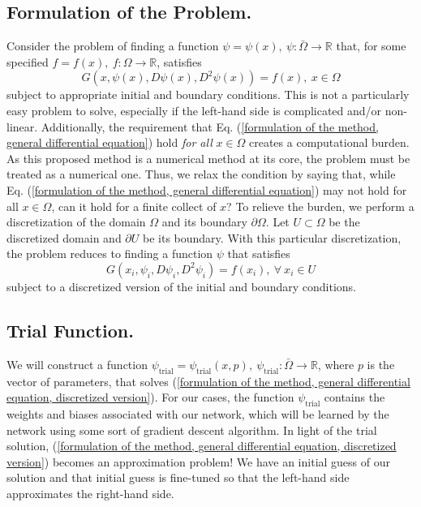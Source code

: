 \documentclass[10pt]{article}
\theoremstyle{plain}
\theoremstyle{definition}
\theoremstyle{remark}
\numberwithin{theorem}{section}
\numberwithin{proposition}{section}
\numberwithin{remark}{section}
\numberwithin{corollary}{section}
\numberwithin{definition}{section}
\numberwithin{lemma}{section}
\numberwithin{equation}{section}
\DeclareMathOperator{\T}{trial}
\begin{document}
\subsection{Formulation of the Problem.}
Consider the problem of finding a function $\psi = \psi(x), \: \psi: \bar{\Omega} \to \mathbb{R}$ that, for some specified $f = f(x), \: f: \Omega \to \mathbb{R}$, satisfies
\begin{equation}
	\label{formulation of the method, general differential equation}
	\displaystyle G(x,\psi(x),D\psi(x), D^2\psi(x)) = f(x), \: x \in \Omega 
\end{equation}
subject to appropriate initial and boundary conditions. This is not a particularly easy problem to solve, especially if the left-hand side is complicated and/or non-linear. Additionally, the requirement that Eq. (\ref{formulation of the method, general differential equation}) hold \textit{for all} $x \in \Omega$ creates a computational burden. As this proposed method is a numerical method at its core, the problem must be treated as a numerical one. Thus, we relax the condition by saying that, while Eq. (\ref{formulation of the method, general differential equation}) may not hold for all $x \in \Omega$, can it hold for a finite collect of $x$? To relieve the burden, we perform a discretization of the domain $\Omega$ and its boundary $\partial \Omega$. Let $U \subset \Omega$ be the discretized domain and $\partial U$ be its boundary. With this particular discretization, the problem reduces to finding a function $\psi$ that satisfies 
\begin{equation}
	\label{formulation of the method, general differential equation, discretized version}
	\displaystyle G(x_i, \psi_i, D\psi_i, D^2\psi_i) = f(x_i), \: \forall \: x_i \in U
\end{equation} 
subject to a discretized version of the initial and boundary conditions. 

\subsection{Trial Function.}
We will construct a function $\psi_{\T} = \psi_{\T}(x,p), \: \psi_{\T} : \bar{\Omega} \to \mathbb{R}$, where $p$ is the vector of parameters, that solves (\ref{formulation of the method, general differential equation, discretized version}). For our cases, the function $\psi_{\T}$ contains the weights and biases associated with our network, which will be learned by the network using some sort of gradient descent algorithm. In light of the trial solution, (\ref{formulation of the method, general differential equation, discretized version}) becomes an approximation problem! We have an initial guess of our solution and that initial guess is fine-tuned so that the left-hand side approximates the right-hand side. 
\end{document}
